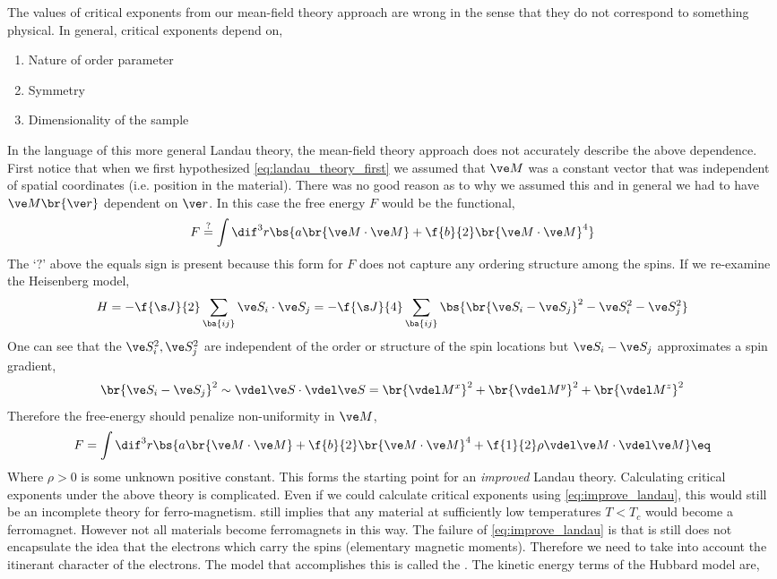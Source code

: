 \documentclass{article}
\begin{document}
The values of critical exponents from our mean-field theory approach are wrong in the sense that they do not correspond to something physical.
In general, critical exponents depend on,
\begin{enumerate}
    \item Nature of order parameter
    \item Symmetry
    \item Dimensionality of the sample
\end{enumerate}
In the language of this more general Landau theory, the mean-field theory approach does not accurately describe the above dependence. First notice that when we first hypothesized \cref{eq:landau_theory_first} we assumed that $\ve M$ was a constant vector that was independent of spatial coordinates (i.e. position in the material). There was no good reason as to why we assumed this and in general we had to have $\ve M\br{\ve r}$ dependent on $\ve r$. In this case the free energy $F$ would be the functional,
\[ F \stackrel{?}{=} \int \dif^3 r \bs{a \br{\ve M \cdot \ve M} + \f{b}{2} \br{\ve M \cdot \ve M}^4} \]
The `$?$' above the equals sign is present because this form for $F$ does not capture any ordering structure among the spins.
If we re-examine the Heisenberg model,
\[ H = - \f{\s J}{2}\sum_{\ba{ij}} \ve S_i \cdot \ve S_j = - \f{\s J}{4} \sum_{\ba{ij}} \bs{\br{\ve S_i - \ve S_j}^2 - \ve S_i^2 - \ve S_j^2} \]
One can see that the $\ve S_i^2,\ve S_j^2$ are independent of the order or structure of the spin locations but $\ve S_i - \ve S_j$ approximates a spin gradient,
\[ \br{\ve S_i - \ve S_j}^2 \sim \vdel \ve S \cdot \vdel \ve S = \br{\vdel M^x}^2 + \br{\vdel M^y}^2+ \br{\vdel M^z}^2 \]
Therefore the free-energy should penalize non-uniformity in $\ve M$,
\[ F = \int \dif^3 r \bs{a \br{\ve M \cdot \ve M} + \f{b}{2} \br{\ve M \cdot \ve M}^4 + \f{1}{2}\rho \vdel \ve M \cdot \vdel \ve M} \eq \label{eq:improve_landau}\]
Where $\rho >0$ is some unknown positive constant. This forms the starting point for an \textit{improved} Landau theory. Calculating critical exponents under the above theory is complicated. Even if we could calculate critical exponents using \cref{eq:improve_landau}, this would still be an incomplete theory for ferro-magnetism.  still implies that any material at sufficiently low temperatures $T<T_c$ would become a ferromagnet. However not all materials become ferromagnets in this way. The failure of \cref{eq:improve_landau} is that is still does not encapsulate the idea that the electrons which carry the spins (elementary magnetic moments). Therefore we need to take into account the itinerant character of the electrons. The model that accomplishes this is called the . The kinetic energy terms of the Hubbard model are,
\end{document}
